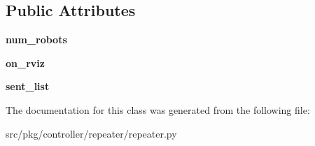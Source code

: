 \subsection*{Public Attributes}
\begin{DoxyCompactItemize}
\item 
\mbox{\label{classrnb-planning_1_1src_1_1pkg_1_1controller_1_1repeater_1_1repeater_1_1_multi_tracker_a25011e6528d6eb3832d868b8e2095ee2}} 
{\bfseries num\+\_\+robots}
\item 
\mbox{\label{classrnb-planning_1_1src_1_1pkg_1_1controller_1_1repeater_1_1repeater_1_1_multi_tracker_a7b4e3f063acf88e48ce2a84bc98a0e82}} 
{\bfseries on\+\_\+rviz}
\item 
\mbox{\label{classrnb-planning_1_1src_1_1pkg_1_1controller_1_1repeater_1_1repeater_1_1_multi_tracker_a576f7da01415f45c3e86e163d7a731e6}} 
{\bfseries sent\+\_\+list}
\end{DoxyCompactItemize}


The documentation for this class was generated from the following file\+:\begin{DoxyCompactItemize}
\item 
src/pkg/controller/repeater/repeater.\+py\end{DoxyCompactItemize}
